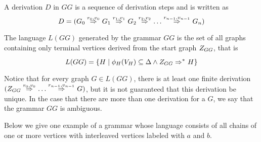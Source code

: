 \documentclass[runningheads]{llncs}
\begin{document}
\begin{definition}
	A derivation $D$ in $GG$ is a sequence of derivation steps and is written as
	\begin{equation*}
		D = (G_0 \deriv{r_0}{v_0}{} G_1 \deriv{r_1}{v_1}{} G_2 \deriv{r_2}{v_2}{} \dots \deriv{r_{n-1}}{v_{n-1}}{} G_n)
	\end{equation*}
\end{definition}

\begin{definition}
	The language $L(GG)$ generated by the grammar $GG$ is the set of all graphs containing only terminal vertices derived from the start graph $Z_{GG}$, that is
	\begin{equation*}
		L(GG) = \{H \st \phi_H(V_H) \subseteq \Delta \land \startG{GG} \derivtr{}{}{} H\}
	\end{equation*}
\end{definition}


Notice that for every graph $G \in L(GG)$, there is at least one finite derivation $(\startG{GG} \deriv{r_0}{v_0}{} \dots \deriv{r_{n-1}}{v_{n-1}}{} G)$, but it is not guaranteed that this derivation be unique. In the case that there are more than one derivation for a $G$, we say that the grammar $GG$ is ambiguous. 

Below we give one example of a grammar whose language consists of all chains of one or more vertices with interleaved vertices labeled with $a$ and $b$.
\end{document}
